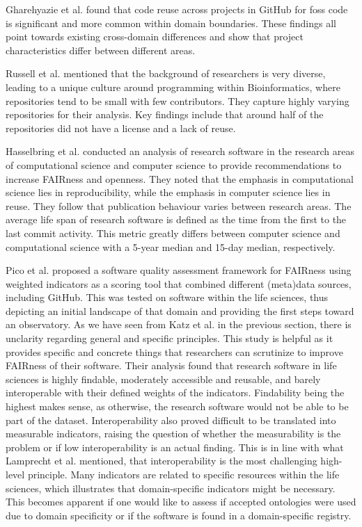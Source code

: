Gharehyazie et al. \cite{gharehyazie_here_2017} 
found that code reuse across projects in GitHub for \acrshort{foss} code is significant and more common within domain boundaries. These findings all point towards existing cross-domain differences and show that project characteristics differ between different areas. 

Russell et al. \cite{russell_large-scale_2018} mentioned that the background of researchers is very diverse, leading to a unique culture around programming within Bioinformatics, where repositories tend to be small with few contributors. They capture highly varying repositories for their analysis. Key findings include that around half of the repositories did not have a license and a lack of reuse.

Hasselbring et al. \cite{hasselbring_open_2020} conducted an analysis of research software in the research areas of computational science and computer science to provide recommendations to increase FAIRness and openness. They noted that the emphasis in computational science lies in reproducibility, while the emphasis in computer science lies in reuse. They follow that publication behaviour varies between research areas. The average life span of research software is defined as the time from the first to the last commit activity. This metric greatly differs between computer science and computational science with a 5-year median and 15-day median, respectively. 

Pico et al. \cite{pico_fairsoft_2022} proposed a software quality assessment framework for FAIRness using weighted indicators as a scoring tool that combined different (meta)data sources, including GitHub. This was tested on software within the life sciences, thus depicting an initial landscape of that domain and providing the first steps toward an observatory. As we have seen from Katz et al. \cite{katz_fair4rs_2021-1} in the previous section, there is unclarity regarding general and specific principles. This study is helpful as it provides specific and concrete things that researchers can scrutinize to improve FAIRness of their software. Their analysis found that research software in life sciences is highly findable, moderately accessible and reusable, and barely interoperable with their defined weights of the indicators. Findability being the highest makes sense, as otherwise, the research software would not be able to be part of the dataset. Interoperability also proved difficult to be translated into measurable indicators, raising the question of whether the measurability is the problem or if low interoperability is an actual finding. This is in line with what Lamprecht et al. \cite{lamprecht_towards_2020} mentioned, that interoperability is the most challenging high-level principle. Many indicators are related to specific resources within the life sciences, which illustrates that domain-specific indicators might be necessary. This becomes apparent if one would like to assess if accepted ontologies were used due to domain specificity or if the software is found in a domain-specific registry.

